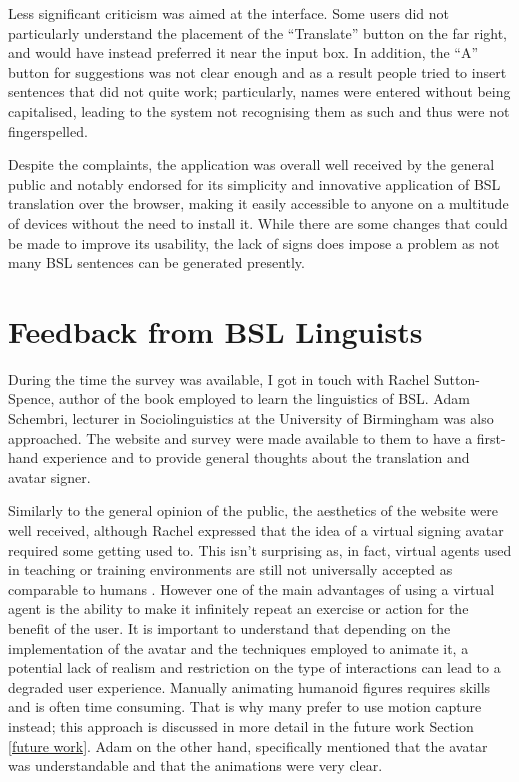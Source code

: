 \documentclass[12pt]{ociamthesis}  %
\begin{document}
Less significant criticism was aimed at the interface. Some users did not particularly understand the placement of the ``Translate'' button on the far right, and would have instead preferred it near the input box. In addition, the ``A'' button for suggestions was not clear enough and as a result people tried to insert sentences that did not quite work; particularly, names were entered without being capitalised, leading to the system not recognising them as such and thus were not fingerspelled.

Despite the complaints, the application was overall well received by the general public and notably endorsed for its simplicity and innovative application of BSL translation over the browser, making it easily accessible to anyone on a multitude of devices without the need to install it. While there are some changes that could be made to improve its usability, the lack of signs does impose a problem as not many BSL sentences can be generated presently.

\section{Feedback from BSL Linguists}
\label{feedback}
During the time the survey was available, I got in touch with Rachel Sutton-Spence, author of the book employed to learn the linguistics of BSL. Adam Schembri, lecturer in Sociolinguistics at the University of Birmingham was also approached. The website and survey were made available to them to have a first-hand experience and to provide general thoughts about the translation and avatar signer.

Similarly to the general opinion of the public, the aesthetics of the website were well received, although  Rachel expressed that the idea of a virtual signing avatar required some getting used to. This isn't surprising as, in fact, virtual agents used in teaching or training environments are still not universally accepted as comparable to humans  . However one of the main advantages of using a virtual agent is the ability to make it infinitely repeat an exercise or action for the benefit of the user. It is important to understand that depending on the implementation of the avatar and the techniques employed to animate it, a potential lack of realism and restriction on the type of interactions can lead to a degraded user experience. Manually animating humanoid figures requires skills and is often time consuming. That is why many prefer to use motion capture instead; this approach is discussed in more detail in the future work Section \ref{future work}. Adam on the other hand, specifically mentioned that the avatar was understandable and that the animations were very clear.
\end{document}
